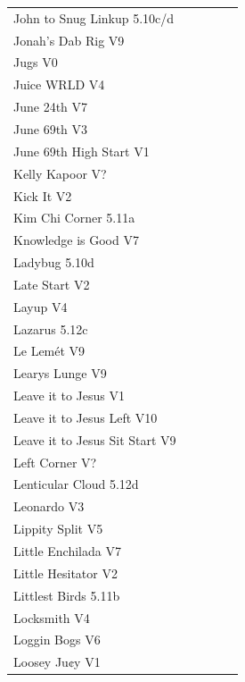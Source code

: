 \begin{flushleft}
\begin{center}
\begin{supertabular}{p{0.76\linewidth}p{0.08\linewidth}}
John to Snug Linkup 5.10c/d & \pageref{vr:John to Snug Linkup} \\
Jonah's Dab Rig V9 & \pageref{rt:Jonah's Dab Rig} \\
Jugs V0 & \pageref{rt:Jugs} \\
Juice WRLD V4 & \pageref{vr:Juice WRLD} \\
June 24th V7 & \pageref{rt:June 24th} \\
June 69th V3 & \pageref{rt:June 69th} \\
June 69th High Start V1 & \pageref{vr:June 69th High Start} \\
Kelly Kapoor V? & \pageref{rt:OB1} \\
Kick It V2 & \pageref{rt:Kick It} \\
Kim Chi Corner 5.11a & \pageref{rt:Kim Chi Corner} \\
Knowledge is Good V7 & \pageref{vr:Knowledge is Good} \\
Ladybug 5.10d & \pageref{rt:Ladybug} \\
Late Start V2 & \pageref{vr:Late Start} \\
Layup V4 & \pageref{vr:Layup} \\
Lazarus 5.12c & \pageref{vr:Lazarus} \\
Le Lemét V9 & \pageref{rt:Le Lemét} \\
Learys Lunge V9 & \pageref{vr:Learys Lunge} \\
Leave it to Jesus V1 & \pageref{rt:Leave it to Jesus} \\
Leave it to Jesus Left V10 & \pageref{vr:Leave it to Jesus Left} \\
Leave it to Jesus Sit Start V9 & \pageref{vr:Leave it to Jesus Sit Start} \\
Left Corner V? & \pageref{rt:Left Corner} \\
Lenticular Cloud 5.12d & \pageref{rt:Lenticular Cloud} \\
Leonardo V3 & \pageref{rt:Leonardo} \\
Lippity Split V5 & \pageref{rt:Lippity Split} \\
Little Enchilada V7 & \pageref{rt:Little Enchilada} \\
Little Hesitator V2 & \pageref{rt:June 1} \\
Littlest Birds 5.11b & \pageref{rt:Littlest Birds} \\
Locksmith V4 & \pageref{rt:Locksmith} \\
Loggin Bogs V6 & \pageref{rt:Loggin Bogs} \\
Loosey Ju¢y V1 & \pageref{rt:Loosey Ju¢y} \\

\end{supertabular}
\end{center}
\end{flushleft}
